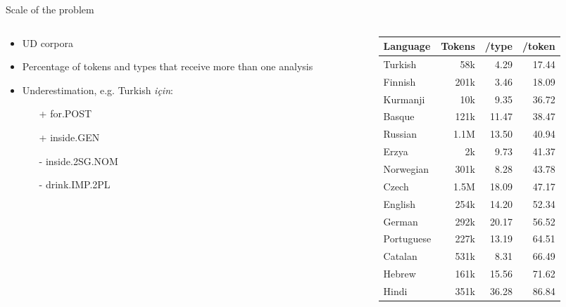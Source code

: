 \documentclass{beamer}
\begin{document}
\begin{frame}{Scale of the problem}

\begin{columns}
\begin{column}{0.4\textwidth}

\begin{itemize}
  \item UD corpora
  \item Percentage of tokens and types that receive more than
    one analysis 
  \item Underestimation, e.g. Turkish \emph{için}:
  \begin{itemize}
    \item[+] for.{\sc POST} 
    \item[+] inside.{\sc GEN}
    \item[-] inside.{\sc 2SG.NOM}
    \item[-] drink.{\sc IMP.2PL}
  \end{itemize}
\end{itemize}

\end{column}
\begin{column}{0.6\textwidth}
    \begin{tabular}{lrrr}
    \textbf{Language} & \textbf{Tokens} & \textbf{/type} & \textbf{/token} \\
    \hline
    Turkish   & 58k &  4.29    &  17.44 \\
    Finnish   & 201k &  3.46   &  18.09 \\
    Kurmanji   & 10k&  9.35    &  36.72 \\
    Basque   & 121k&  11.47    &  38.47 \\
    Russian  & 1.1M &  13.50    &  40.94 \\
    Erzya   & 2k &  9.73   &   41.37 \\
    Norwegian  & 301k &  8.28    &  43.78 \\
    Czech   & 1.5M &  18.09   &   47.17 \\
    English   & 254k &  14.20    &  52.34 \\
    German   & 292k &  20.17    &  56.52 \\
    Portuguese  & 227k&  13.19    &  64.51 \\
    Catalan   & 531k &  8.31   &  66.49 \\
    Hebrew   & 161k &  15.56   &  71.62 \\
    Hindi   & 351k &  36.28   &  86.84 \\
    \hline
    \end{tabular}
    
\end{column}

\end{columns}

\end{frame}
\end{document}
